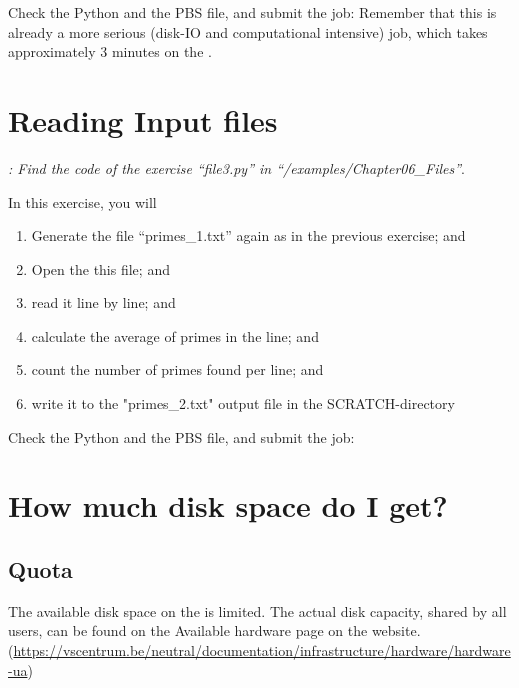 Check the Python and the PBS file, and submit the job: Remember that this is
already a more serious (disk-IO and computational intensive) job, which takes
approximately 3 minutes on the \hpc.

\begin{prompt}
\end{prompt}

\section{Reading Input files}

\textit{: Find the code of the exercise ``file3.py'' in
``\tilde/examples/Chapter06\_Files''}.

In this exercise, you will
\begin{enumerate}
\item  Generate the file ``primes\_1.txt'' again as in the previous exercise; and
\item  Open the this file; and
\item  read it line by line; and
\item  calculate the average of primes in the line; and
\item  count the number of primes found per line; and
\item  write it to the "primes\_2.txt" output file in the SCRATCH-directory
\end{enumerate}

Check the Python and the PBS file, and submit the job:

\begin{prompt}
\end{prompt}

\section{How much disk space do I get?}

\subsection{Quota}

\ifantwerpen
The available disk space on the \hpc is limited. The actual disk capacity,
shared by all users, can be found on the Available hardware page on the
website.
(\url{https://vscentrum.be/neutral/documentation/infrastructure/hardware/hardware-ua})

